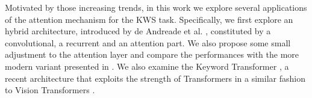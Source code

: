 Motivated by those increasing trends, in this work we explore several applications of the attention mechanism for the KWS task. Specifically, we first explore an hybrid architecture, introduced by de Andreade et al. \cite{attention2018andreade}, constituted by a convolutional, a recurrent and an attention part. %
 We also propose some small adjustment to the attention layer and compare the performances with the more modern variant presented in \cite{streamingkws2020Rybakov}. We also examine the Keyword Transformer \cite{kwtransformer2021berg}, a recent architecture that exploits the strength of Transformers in a similar fashion to Vision Transformers \cite{vit2020Dosovitskiy}.


